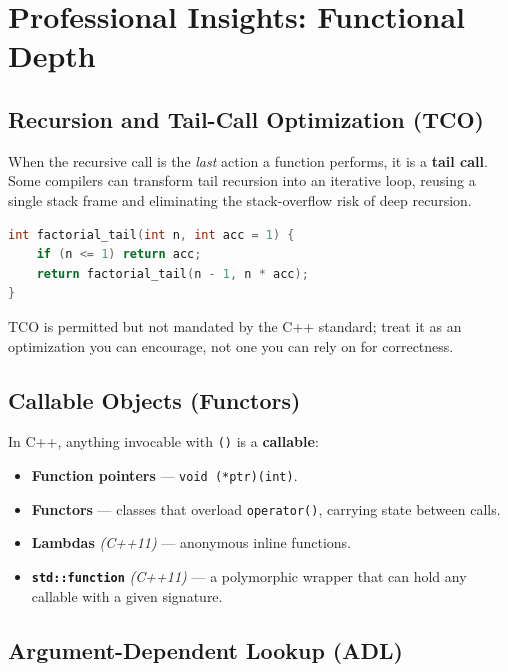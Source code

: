 \section{Professional Insights: Functional Depth}
\label{sec:functional-depth}

\subsection{Recursion and Tail-Call Optimization (TCO)}

When the recursive call is the \textit{last} action a function performs, it is a \textbf{tail call}. Some compilers can transform tail recursion into an iterative loop, reusing a single stack frame and eliminating the stack-overflow risk of deep recursion.

\begin{lstlisting}[language=C++, caption={Tail-recursive factorial}]
int factorial_tail(int n, int acc = 1) {
    if (n <= 1) return acc;
    return factorial_tail(n - 1, n * acc);
}
\end{lstlisting}

TCO is permitted but not mandated by the C++ standard; treat it as an optimization you can encourage, not one you can rely on for correctness.

\subsection{Callable Objects (Functors)}

In C++, anything invocable with \texttt{()} is a \textbf{callable}:

\begin{itemize}
    \item \textbf{Function pointers} --- \texttt{void (*ptr)(int)}.
    \item \textbf{Functors} --- classes that overload \texttt{operator()}, carrying state between calls.
    \item \textbf{Lambdas} \textit{(C++11)} --- anonymous inline functions.
    \item \textbf{\texttt{std::function}} \textit{(C++11)} --- a polymorphic wrapper that can hold any callable with a given signature.
\end{itemize}

\subsection{Argument-Dependent Lookup (ADL)}

